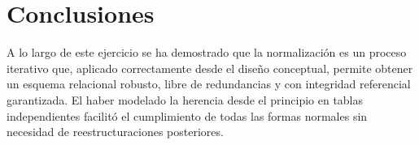 \documentclass[12pt, a4paper]{article}
\begin{document}
\section{Conclusiones}

A lo largo de este ejercicio se ha demostrado que la normalización es un proceso iterativo que, aplicado correctamente desde el diseño conceptual, permite obtener un esquema relacional robusto, libre de redundancias y con integridad referencial garantizada. El haber modelado la herencia desde el principio en tablas independientes facilitó el cumplimiento de todas las formas normales sin necesidad de reestructuraciones posteriores.
\end{document}
